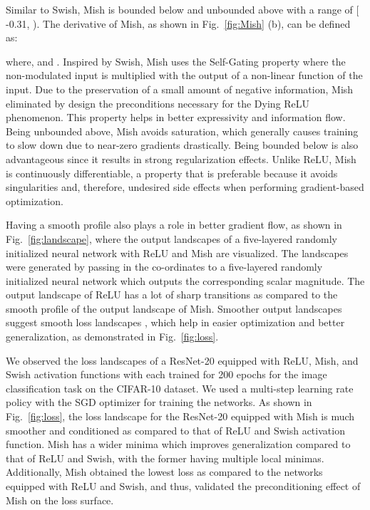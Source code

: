 \documentclass{bmvc2k}
\begin{document}
Similar to Swish, Mish is bounded below and unbounded above with a range of [ -0.31, ). The  derivative of Mish, as shown in Fig.~\ref{fig:Mish} (b), can be defined as:

where,  and . Inspired by Swish, Mish uses the Self-Gating property where the non-modulated input is multiplied with the output of a non-linear function of the input. Due to the preservation of a small amount of negative information, Mish eliminated by design the preconditions necessary for the Dying ReLU phenomenon. This property helps in better expressivity and information flow. Being unbounded above, Mish avoids saturation, which generally causes training to slow down due to near-zero gradients \cite{glorot2010understanding} drastically. Being bounded below is also advantageous since it results in strong regularization effects. Unlike ReLU, Mish is continuously differentiable, a property that is preferable because it avoids singularities and, therefore, undesired side effects when performing gradient-based optimization. 

Having a smooth profile also plays a role in better gradient flow, as shown in Fig.~\ref{fig:landscape}, where the output landscapes of a five-layered randomly initialized neural network with ReLU and Mish are visualized.  The landscapes were generated by passing in the co-ordinates to a five-layered randomly initialized neural network which outputs the corresponding scalar magnitude. The output landscape of ReLU has a lot of sharp transitions as compared to the smooth profile of the output landscape of Mish. Smoother output landscapes suggest smooth loss landscapes \cite{li2018visualizing}, which help in easier optimization and better generalization, as demonstrated in Fig.~\ref{fig:loss}. 

We observed the loss landscapes \cite{li2018visualizing} of a ResNet-20 \cite{he2016deep} equipped with ReLU, Mish, and Swish activation functions with each trained for 200 epochs for the image classification task on the CIFAR-10 dataset. We used a multi-step learning rate policy with the SGD optimizer for training the networks. As shown in Fig.~\ref{fig:loss}, the loss landscape for the ResNet-20 equipped with Mish is much smoother and conditioned as compared to that of ReLU and Swish activation function. Mish has a wider minima which improves generalization compared to that of ReLU and Swish, with the former having multiple local minimas. Additionally, Mish obtained the lowest loss as compared to the networks equipped with ReLU and Swish, and thus, validated the preconditioning effect of Mish on the loss surface.
\end{document}

